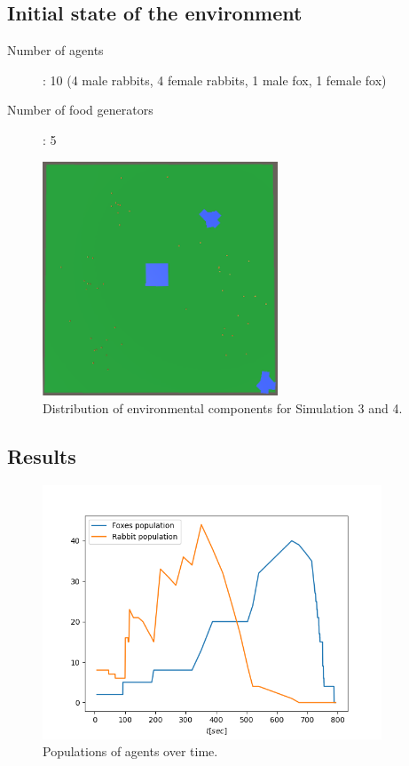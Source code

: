 \subsection{Initial state of the environment}
\begin{description}
    \item[Number of agents]: 10 (4 male rabbits, 4 female rabbits, 1 male fox, 1 female fox)
    \item[Number of food generators]: 5
\end{description}

\begin{figure}[H]
    \centering
    \includegraphics[width=7cm]{Images/Area_Simulation_5_and_6_with_foxes.png}
    \caption{Distribution of environmental components for Simulation 3 and 4.}
    \label{fig:simulation3EnvLayout}
\end{figure}
    
\subsection{Results}

\begin{figure}[H]
    \centering
    \includegraphics[width=0.9\textwidth]{Images/SimulationResults/Simulation_5_Foxes population_Rabbit population.png}
    \caption{Populations of agents over time.}
    \label{fig:simulation3Pupulations}
\end{figure}

